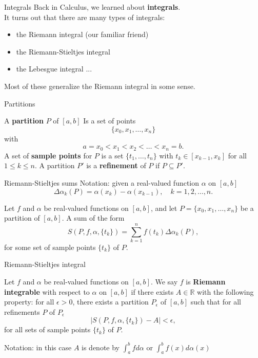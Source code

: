 \documentclass{beamer}
\begin{document}
\begin{frame}{Integrals}
Back in Calculus, we learned about \textbf{integrals}.\\
\pause
It turns out that there are many types of integrals:
\begin{itemize}
\pause
\item the Riemann integral (our familiar friend)
\pause
\item the Riemann-Stieltjes integral
\pause
\item the Lebesgue integral ...
\end{itemize}
\pause
Most of these generalize the Riemann integral in some sense.
\end{frame}

\begin{frame}{Partitions}
\begin{defn}
A \textbf{partition} $P$ of $[a,b]$ Is a set of points
$$\{x_0,x_1,\dots,x_n\}$$
with
$$a=x_0 < x_1 < x_2 < \dots < x_n =b.$$
\pause
A set of \textbf{sample points} for $P$ is a set $\{t_1,\dots, t_n\}$ with $t_k\in [x_{k-1},x_k]$ for all $1\leq k\leq n$.
\pause
A partition $P'$ is a \textbf{refinement} of $P$ if $P\subseteq P'$.
\end{defn}
\end{frame}

\begin{frame}{Riemann-Stieltjes sums}
Notation: given a real-valued function $\alpha$ on $[a,b]$\\
$$\Delta \alpha_k(P) = \alpha(x_k)-\alpha(x_{k-1}),\quad k=1,2,\dots,n.$$
\pause
\begin{defn}
\pause
Let $f$ and $\alpha$ be real-valued functions on $[a,b]$, and let $P = \{x_0,x_1,\dots,x_n\}$ be a partition of $[a,b]$.
\pause
A sum of the form
$$S(P,f,\alpha,\{t_k\}) = \sum_{k=1}^n f(t_k) \Delta\alpha_k(P),$$
for some set of sample points $\{t_k\}$ of $P$.
\end{defn}
\end{frame}

\begin{frame}{Riemann-Stieltjes integral}
\begin{defn}
\pause
Let $f$ and $\alpha$ be real-valued functions on $[a,b]$.
\pause
We say $f$ is \textbf{Riemann integrable} with respect to $\alpha$ on $[a,b]$ if there exists $A\in\mathbb{R}$ with the following property:
\pause 
for all $\epsilon > 0$, there exists a partition $P_\epsilon$ of $[a,b]$ such that for all refinements $P$ of $P_\epsilon$
$$|S(P,f,\alpha,\{t_k\}) - A| < \epsilon,$$
for all sets of sample points $\{t_k\}$ of $P$.
\end{defn}
\pause
Notation: in this case $A$ is denote by $\int_a^b f d\alpha$ or $\int_a^b f(x) d\alpha(x)$
\end{frame}
\end{document}
